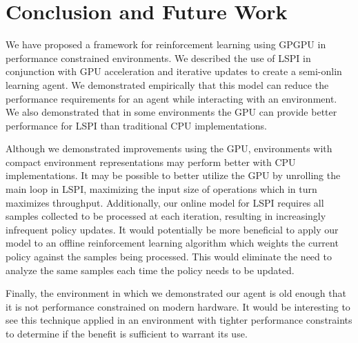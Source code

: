 \chapter{Conclusion and Future Work}
\label{chap:conclusion}

We have proposed a framework for reinforcement learning using GPGPU in performance constrained environments. We described the use of LSPI in conjunction with GPU acceleration and iterative updates to create a semi-onlin learning agent. We demonstrated empirically that this model can reduce the performance requirements for an agent while interacting with an environment. We also demonstrated that in some environments the GPU can provide better performance for LSPI than traditional CPU implementations.

Although we demonstrated improvements using the GPU, environments with compact environment representations may perform better with CPU implementations. It may be possible to better utilize the GPU by unrolling the main loop in LSPI, maximizing the input size of operations which in turn maximizes throughput. Additionally, our online model for LSPI requires all samples collected to be processed at each iteration, resulting in increasingly infrequent policy updates. It would potentially be more beneficial to apply our model to an offline reinforcement learning algorithm which weights the current policy against the samples being processed. This would eliminate the need to analyze the same samples each time the policy needs to be updated.

Finally, the environment in which we demonstrated our agent is old enough that it is not performance constrained on modern hardware. It would be interesting to see this technique applied in an environment with tighter performance constraints to determine if the benefit is sufficient to warrant its use.